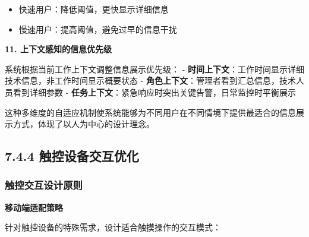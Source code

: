 \begin{Shaded}
\begin{Highlighting}[]
\OperatorTok{=}\OperatorTok{*}\NormalTok{ (} \OperatorTok{+}
\end{Highlighting}
\end{Shaded}

\begin{itemize}
\tightlist
\item
  快速用户：降低阈值，更快显示详细信息
\item
  慢速用户：提高阈值，避免过早的信息干扰
\end{itemize}

\textbf{11. 上下文感知的信息优先级}

系统根据当前工作上下文调整信息展示优先级： - \textbf{时间上下文}：工作时间显示详细技术信息，非工作时间显示概要状态 - \textbf{角色上下文}：管理者看到汇总信息，技术人员看到详细参数 - \textbf{任务上下文}：紧急响应时突出关键告警，日常监控时平衡展示

这种多维度的自适应机制使系统能够为不同用户在不同情境下提供最适合的信息展示方式，体现了以人为中心的设计理念。

\subsection{7.4.4 触控设备交互优化}\label{ux89e6ux63a7ux8bbeux5907ux4ea4ux4e92ux4f18ux5316}

\subsubsection{触控交互设计原则}\label{ux89e6ux63a7ux4ea4ux4e92ux8bbeux8ba1ux539fux5219}

\textbf{移动端适配策略}

针对触控设备的特殊需求，设计适合触摸操作的交互模式：

